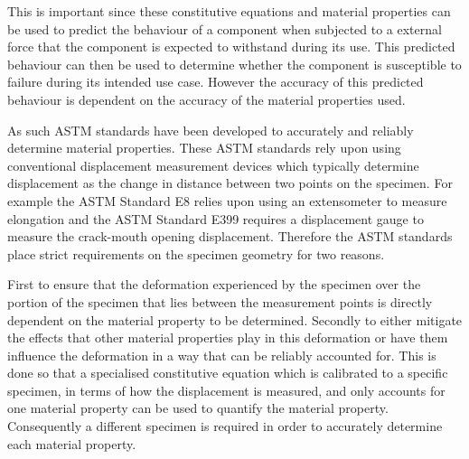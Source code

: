 \documentclass[12pt,oneside,openany,a4paper, %
english, %
masters-t, goldenblock]{usthesis}
\begin{document}
This is important since these constitutive equations and material properties can be used to predict the behaviour of a component when subjected to a external force that the component is expected to withstand during its use. This predicted behaviour can then be used to determine whether the component is susceptible to failure during its intended use case. However the accuracy of this predicted behaviour is dependent on the accuracy of the material properties used.

As such ASTM standards have been developed to accurately and reliably determine material properties. These ASTM standards rely upon using conventional displacement measurement devices which typically determine displacement as the change in distance between two points on the specimen. For example the ASTM Standard E8 \cite{ASTME8} relies upon using an extensometer to measure elongation and the ASTM Standard E399 \cite{ASTME399} requires a displacement gauge to measure the crack-mouth opening displacement. Therefore the ASTM standards place strict requirements on the specimen geometry for two reasons. 

First to ensure that the deformation experienced by the specimen over the portion of the specimen that lies between the measurement points is directly dependent on the material property to be determined. Secondly to either mitigate the effects that other material properties play in this deformation or have them influence the deformation in a way that can be reliably accounted for. This is done so that a specialised constitutive equation which is calibrated to a specific specimen, in terms of how the displacement is measured, and only accounts for one material property can be used to quantify the material property. Consequently a different specimen is required in order to accurately determine each material property.



\end{document}
